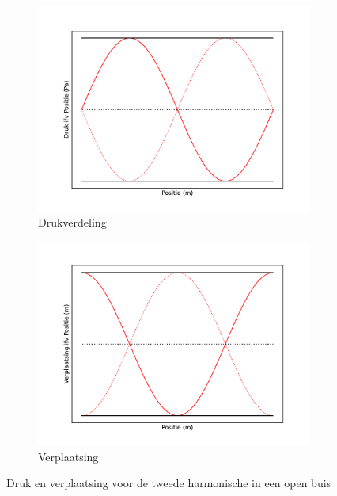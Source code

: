 \documentclass[a4paper,kul]{kulakarticle} %
\begin{document}
\begin{figure}[!h]
	\centering
	\begin{subfigure}{.5\textwidth}
		\centering
		\includegraphics[width=1\linewidth]{OpenBuisTweedeDruk}
		\caption{Drukverdeling}
		\label{fig:TweedeBuisDruk}
	\end{subfigure}%
	\begin{subfigure}{.5\textwidth}
		\centering
		\includegraphics[width=1\linewidth]{OpenBuisTweedeVerplaatsing}
		\caption{Verplaatsing}
		\label{fig:TweedeBuisVerplaatsing}
	\end{subfigure}
	\caption{Druk en verplaatsing voor de tweede harmonische in een open buis}
	\label{fig:OpenBuisTweede}
\end{figure}
\end{document}
